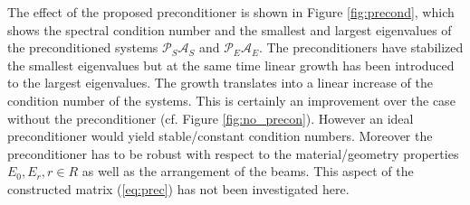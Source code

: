 \documentclass{marine_2015}
\begin{document}
The effect of the proposed preconditioner is shown in Figure \ref{fig:precond},
which shows the spectral condition number and the smallest and largest
eigenvalues of the preconditioned systems $\mathcal{P}_S\mathcal{A}_S$ and 
$\mathcal{P}_E\mathcal{A}_E$. The preconditioners have stabilized the smallest 
eigenvalues but at the same time linear growth has been introduced to the largest 
eigenvalues. The growth translates into a linear increase of the condition number 
of the systems. This is certainly an improvement over the case without the
preconditioner (cf. Figure \ref{fig:no_precon}). However an ideal preconditioner 
would yield stable/constant condition numbers. Moreover the preconditioner has to 
be robust with respect to the material/geometry properties $E_0, E_r, r\in R$ as 
well as the arrangement of the beams. This aspect of the constructed matrix (\ref{eq:prec}) 
has not been investigated here.
\end{document}
